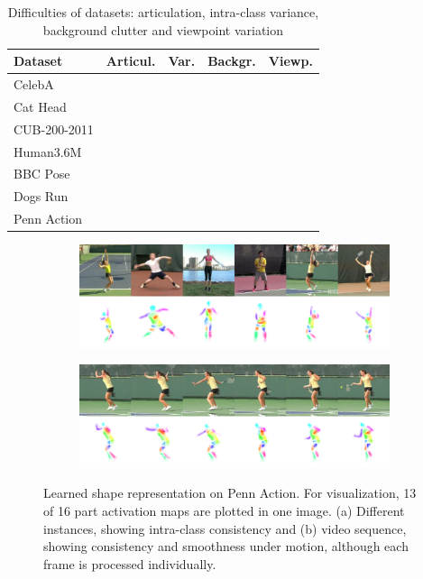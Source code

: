 %
\begin{table}
	\caption{Difficulties of datasets: articulation, intra-class variance, background clutter and viewpoint variation}
	\label{tab:challenges}
	\begin{tabular}{l|rrrr}
		Dataset &  Articul.& Var. &  Backgr.& Viewp.  \\ \hline
		CelebA &   &  &  &    \\
		Cat Head & &  \checkmark&  &   \\
		CUB-200-2011 & & \checkmark& \checkmark&   \\
		Human3.6M &\checkmark& &  & \checkmark  \\
		BBC Pose &  \checkmark&  & \checkmark&  \\
		Dogs Run & \checkmark& \checkmark& \checkmark&   \\
		Penn Action & \checkmark& \checkmark& \checkmark& \checkmark\\
	\end{tabular}
\end{table}
%
\begin{figure}[t]
	\begin{subfigure}{0.5\textwidth}
	\centering
	\includegraphics[trim={0cm 0cm 0cm 0cm},clip, width=1.\linewidth]{fig/shape6white}\caption{}
	\label{fig:shape_penn}
	\end{subfigure}
	\begin{subfigure}{0.5\textwidth}
	\centering
	\includegraphics[trim={0cm 0cm 0cm 0cm},clip, width=1.\linewidth]{fig/shape_tennis}\caption{}
	\label{fig:shape_tennis}
	\end{subfigure}
	\caption{Learned shape representation on Penn Action. For visualization, 13 of 16 part activation maps are plotted in one image. (a) Different instances, showing intra-class consistency and (b) video sequence, showing consistency and smoothness under motion, although each frame is processed individually.}
	\label{fig:shape}
\end{figure}
